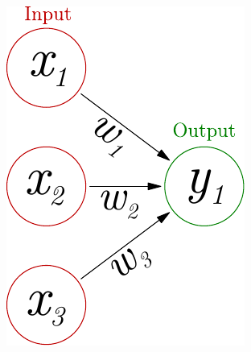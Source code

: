 \documentclass{beamer}
\newcommand{\figheight}{0.72\textheight}
\begin{document}
\begin{frame}
\begin{columns}[T]
\begin{column}{.55\textwidth}
\begin{flushleft}
 \includegraphics[height = \figheight]{./fig/perceptron_maths.pdf}
 \vspace{1cm}

\end{flushleft}
    \end{column}
  \end{columns}
\end{frame}
\end{document}
